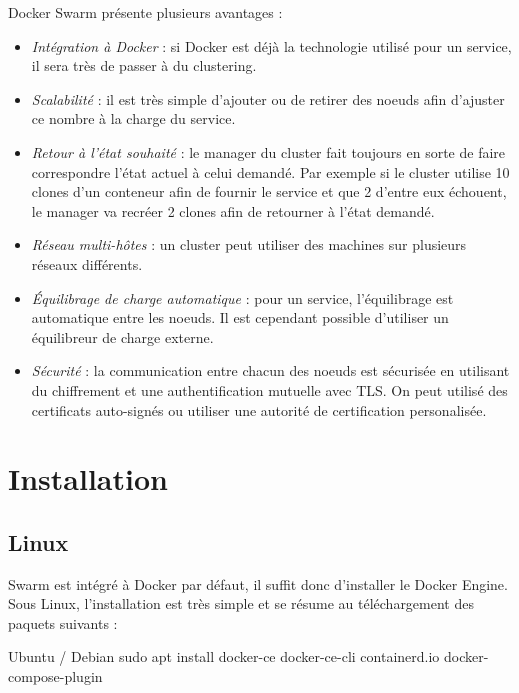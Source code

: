Docker Swarm présente plusieurs avantages :
\begin{itemize}
    \item \emph{Intégration à Docker} : si Docker est déjà la technologie utilisé pour un service,
        il sera très de passer à du clustering.

    \item \emph{Scalabilité} : il est très simple d'ajouter ou de retirer des noeuds afin d'ajuster
        ce nombre à la charge du service.

    \item \emph{Retour à l'état souhaité} : le manager du cluster fait toujours en sorte de faire
        correspondre l'état actuel à celui demandé. Par exemple si le cluster utilise 10 clones
        d'un conteneur afin de fournir le service et que 2 d'entre eux échouent, le manager va
        recréer 2 clones afin de retourner à l'état demandé.

    \item \emph{Réseau multi-hôtes} : un cluster peut utiliser des machines sur plusieurs réseaux
        différents.

    \item \emph{Équilibrage de charge automatique} : pour un service, l'équilibrage est automatique
        entre les noeuds. Il est cependant possible d'utiliser un équilibreur de charge externe.
    
    \item \emph{Sécurité} : la communication entre chacun des noeuds est sécurisée en utilisant
        du chiffrement et une authentification mutuelle avec TLS. On peut utilisé des certificats
        auto-signés ou utiliser une autorité de certification personalisée.
\end{itemize}

\chapter{Installation}

\section{Linux}

Swarm est intégré à Docker par défaut, il suffit donc d'installer le Docker Engine.
Sous Linux, l'installation est très simple et se résume au téléchargement des paquets suivants :

\begin{bashWithTitle}{Ubuntu / Debian}
sudo apt install docker-ce docker-ce-cli containerd.io docker-compose-plugin
\end{bashWithTitle}

